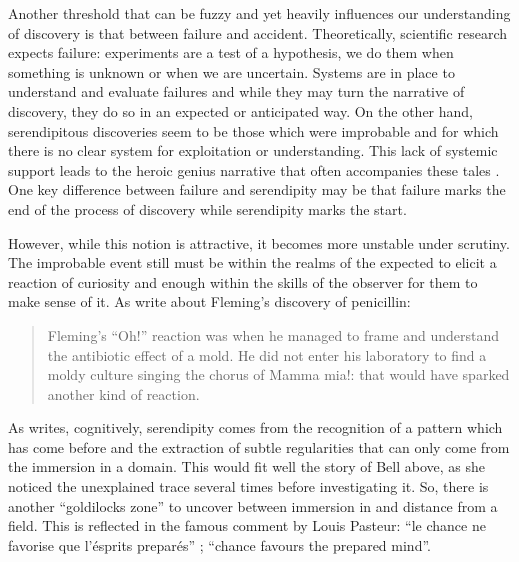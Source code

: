 \documentclass[authordate, empirical]{jote-new-article}
\begin{document}
Another threshold that can be fuzzy and yet heavily influences our understanding of discovery is that between failure and accident. Theoretically, scientific research expects failure: experiments are a test of a hypothesis, we do them when something is unknown or when we are uncertain. Systems are in place to understand and evaluate failures and while they may turn the narrative of discovery, they do so in an expected or anticipated way. On the other hand, serendipitous discoveries seem to be those which were improbable and for which there is no clear system for exploitation or understanding. This lack of systemic support leads to the heroic genius narrative that often accompanies these tales \parencites{Copeland2018}. One key difference between failure and serendipity may be that failure marks the end of the process of discovery while serendipity marks the start.



However, while this notion is attractive, it becomes more unstable under scrutiny. The improbable event still must be within the realms of the expected to elicit a reaction of curiosity and enough within the skills of the observer for them to make sense of it. As \textcites[][p. 5]{Arfini2018} write about Fleming's discovery of penicillin:



\begin{quotation}
  Fleming's “Oh!” reaction was when he managed to frame and understand the antibiotic effect of a mold. He did not enter his laboratory to find a moldy culture singing the chorus of Mamma mia!: that would have sparked another kind of reaction.
\end{quotation}


As \textcites{Boden2004} writes, cognitively, serendipity comes from the recognition of a pattern which has come before and the extraction of subtle regularities that can only come from the immersion in a domain. This would fit well the story of Bell above, as she noticed the unexplained trace several times before investigating it. So, there is another “goldilocks zone” to uncover between immersion in and distance from a field. This is reflected in the famous comment by Louis Pasteur: “le chance ne favorise que l'ésprits preparés” \parencites{Pasteur1854}; “chance favours the prepared mind”.
\end{document}
